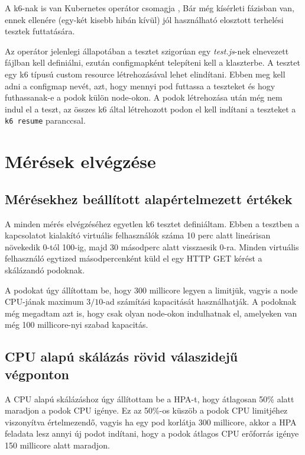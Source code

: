 \documentclass[a4paper,oneside]{article}
\begin{document}
A k6-nak is van Kubernetes operátor csomagja \cite{k6-operator}, Bár még
kísérleti fázisban van, ennek ellenére (egy-két kisebb hibán kívül) jól
használható elosztott terhelési tesztek futtatására.

Az operátor jelenlegi állapotában a tesztet szigorúan egy \emph{test.js}-nek
elnevezett fájlban kell definiálni, ezután configmapként telepíteni kell a
klaszterbe. A tesztet egy k6 típusú custom resource létrehozásával lehet
elindítani. Ebben meg kell adni a configmap nevét, azt, hogy mennyi pod futtassa
a teszteket és hogy futhassanak-e a podok külön node-okon. A podok létrehozása
után még nem indul el a teszt, az összes k6 által létrehozott podon el kell
indítani a teszteket a \verb|k6 resume| paranccsal.
  
\newpage
\section{Mérések elvégzése}
\label{sec:az-elvegzett-munka}

\subsection{Mérésekhez beállított alapértelmezett értékek}

A minden mérés elvégzéséhez egyetlen k6 tesztet definiáltam. Ebben a tesztben a
kapcsolatot kialakító virtuális felhasználók száma 10 perc alatt lineárisan
növekedik 0-tól 100-ig, majd 30 másodperc alatt visszaesik 0-ra. Minden
virtuális felhasználó egytized másodpercenként küld el egy HTTP GET kérést a
skálázandó podoknak.

A podokat úgy állítottam be, hogy 300 millicore legyen a limitjük, vagyis a node
CPU-jának maximum $3/10$-ad számítási kapacitását használhatják. A podoknak még
megadtam azt is, hogy csak olyan node-okon indulhatnak el, amelyeken van még 100
millicore-nyi szabad kapacitás.

\subsection{CPU alapú skálázás rövid válaszidejű végponton}
\label{secsec:cpu_scaling}

A CPU alapú skálázáshoz úgy állítottam be a HPA-t, hogy átlagosan 50\% alatt
maradjon a podok CPU igénye. Ez az 50\%-os küszöb a podok CPU limitjéhez
viszonyítva értelmezendő, vagyis ha egy pod korlátja 300 millicore, akkor a HPA
feladata lesz annyi új podot indítani, hogy a podok átlagos CPU erőforrás igénye
150 millicore alatt maradjon.
\end{document}
